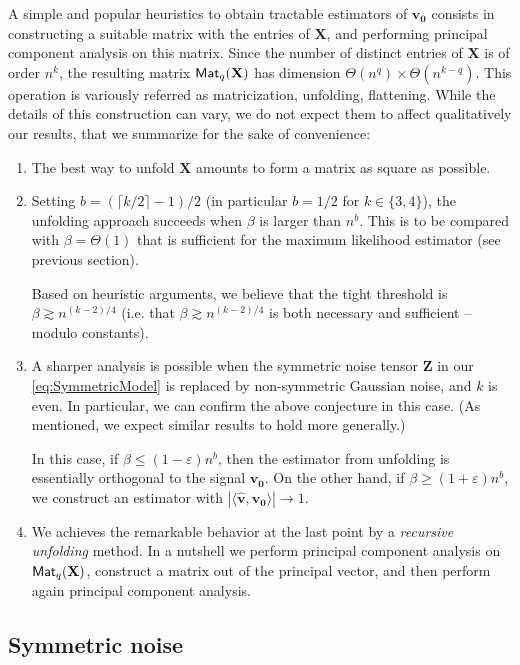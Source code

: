 \documentclass[11pt]{article}
\theoremstyle{definition}
\def\<{\langle}
\def\>{\rangle}
\def\hbv{\mathbf{\widehat{v}}}
\def\bvz{\mathbf{v_0}}
\def\bX{\mathbf{X}}
\def\bZ{\mathbf{Z}}
\def\M{{\sf Mat}}
\def\eps{\varepsilon}
\begin{document}
A  simple and popular heuristics to obtain tractable
estimators of $\bvz$ consists in constructing a suitable matrix with
the entries of $\bX$, and performing principal component analysis on this
matrix. 
Since the number of distinct entries of $\bX$ is of order
$n^k$,
the resulting matrix $\M_q(\bX)$ has dimension $\Theta(n^q)\times
\Theta(n^{k-q})$. This operation is variously referred as
matricization, unfolding, flattening.
While the details of this construction can vary, we
do not expect them to affect qualitatively our results, that we
summarize for the sake of convenience:
%
\begin{enumerate}
%
\item The best way to unfold $\bX$ amounts to form a matrix as
  square as possible.
%
\item Setting $b = (\lceil k/2\rceil - 1)/2$ (in particular $b =
  1/2$ for $k\in\{3,4\}$), the unfolding approach succeeds when
  $\beta$ is larger than $n^b$. This is to be compared with
  $\beta = \Theta(1)$ that is sufficient for the maximum likelihood
  estimator (see previous section).

Based on heuristic arguments, we believe that the tight threshold is
$\beta\gtrsim n^{(k-2)/4}$ (i.e. that $\beta\gtrsim n^{(k-2)/4}$ is
both necessary and sufficient --modulo constants).
%
\item A sharper analysis is possible when the symmetric noise tensor
  $\bZ$ in our \ref{eq:SymmetricModel} is replaced by non-symmetric
  Gaussian noise, and $k$ is even. In particular, we can confirm the 
above conjecture in this case. (As mentioned, we expect similar results to hold
  more generally.)

In this case, if $\beta\le (1-\eps) n^b$, then the estimator from
unfolding is essentially orthogonal to the signal $\bvz$. On the
other hand, if  $\beta\ge (1+\eps) n^b$, we construct an estimator
with $|\<\hbv,\bvz\>|\to 1$. 
%
\item We achieves the remarkable behavior at
  the last point by a \emph{recursive unfolding} method. In a
  nutshell we perform principal component analysis on $\M_q(\bX)$,
construct a matrix out of the principal vector, and then perform again
principal component analysis.
\end{enumerate}

\subsection{Symmetric noise}
\end{document}
